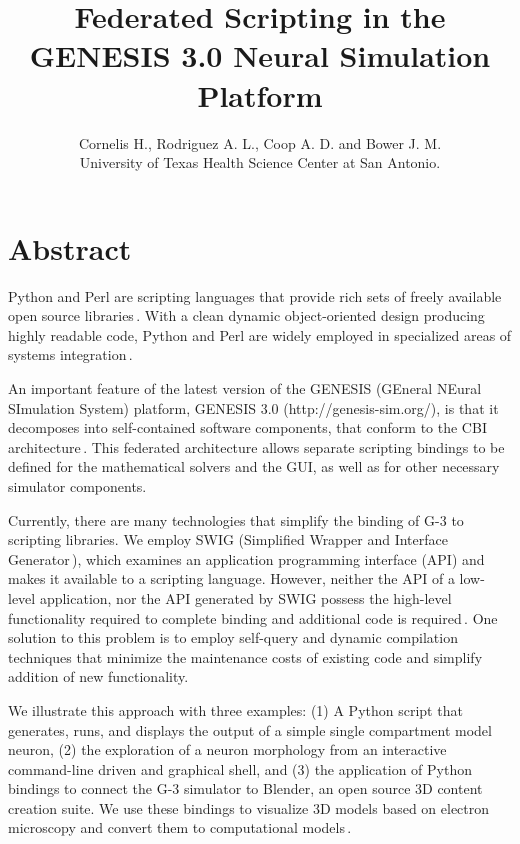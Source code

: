 \documentclass[12pt]{article}
\begin{document}
\title{\bf Federated Scripting in the GENESIS 3.0 Neural Simulation
  Platform}

\author{Cornelis H., Rodriguez A. L., Coop A. D. and Bower J. M. \\
  {\small University of Texas Health Science Center at San Antonio.}
}

\maketitle
{}
\newpage
\section*{Abstract}
Python and Perl are scripting languages that provide rich sets of
freely available open source
libraries\,\cite{langtangen04:_python_scrip_comput_scien,valiente09:_combin_patter_match_algor_comput}.
With a clean dynamic object-oriented design producing highly readable
code, Python and Perl are widely employed in specialized areas of
systems
integration\,\cite{thiruvathukal01:_web_progr_python, lee07:_open_sourc_devel_lamp}.

An important feature of the latest version of the GENESIS (GEneral
NEural SImulation System) platform, GENESIS 3.0 
(http://genesis-sim.org/), is that it decomposes into self-contained
software components, that conform to the CBI
architecture\,\cite{cornelis08:_cbi_archit_comput_simul_realis}.  This
federated architecture allows separate scripting bindings to be
defined for the mathematical solvers and the GUI, as well as for other
necessary simulator components.

Currently, there are many technologies that simplify the binding of
G-3 to scripting libraries.  We employ SWIG (Simplified Wrapper and
Interface Generator\,\cite{08:_simpl_wrapp_inter_gener}), which
examines an application programming interface (API) and makes it
available to a scripting language.  However, neither the API of a
low-level application, nor the API generated by SWIG possess the
high-level functionality required to complete binding and additional
code is required\,\cite{08:_swig_python,08:_swig_perl}. One
solution to this problem is to employ self-query and dynamic
compilation techniques that minimize the maintenance costs of existing
code and simplify addition of new functionality.

We illustrate this approach with three examples: (1) A Python script
that generates, runs, and displays the output of a simple single
compartment model neuron, (2) the exploration of a neuron morphology
from an interactive command-line driven and graphical shell, and (3)
the application of Python bindings to connect the G-3 simulator to
Blender, an open source 3D content creation suite.  We use these
bindings to visualize 3D models based on electron microscopy and
convert them to computational
models\,\cite{cornelis08:_model_neuros_genes}.
\end{document}
